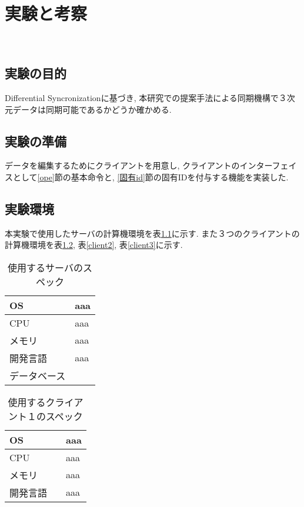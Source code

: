 \chapter{実験と考察}　\label{chap:test}
\section{実験の目的}
Differential Syncronizationに基づき, 本研究での提案手法による同期機構で３次元データは同期可能であるかどうか確かめる.
\section{実験の準備}
データを編集するためにクライアントを用意し, クライアントのインターフェイスとして\ref{ope}節の基本命令と, \ref{固有id}節の固有IDを付与する機能を実装した.
\section{実験環境}
本実験で使用したサーバの計算機環境を表\ref{server}に示す. また３つのクライアントの計算機環境を表\ref{client1}, 表\ref{client2}, 表\ref{client3}に示す.
\begin{table}[htbp]
\begin{center}
	\caption{使用するサーバのスペック}
	\begin{tabular}{|l|l|} \hline
		OS & aaa \\ \hline
		CPU & aaa \\ \hline
		メモリ & aaa \\ \hline
    開発言語　& aaa \\ \hline
		データベース & \\ \hline
	\end{tabular}
	\label{server}
\end{center}
\end{table}

\begin{table}[htbp]
\begin{center}
	\caption{使用するクライアント１のスペック}
	\begin{tabular}{|l|l|} \hline
		OS & aaa \\ \hline
		CPU & aaa \\ \hline
		メモリ & aaa \\ \hline
    開発言語　& aaa \\ \hline
	\end{tabular}
	\label{client1}
\end{center}
\end{table}

